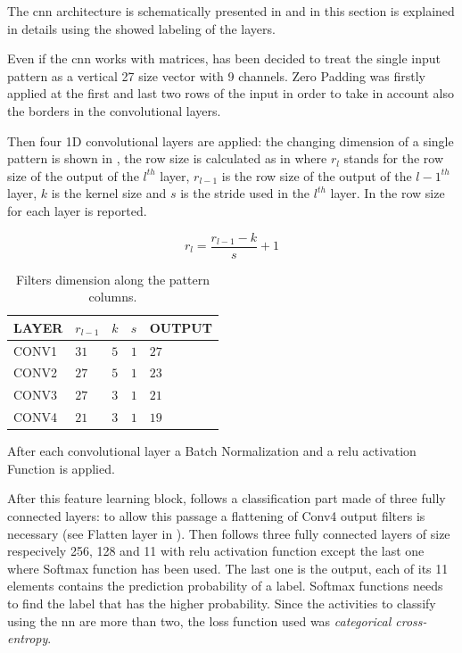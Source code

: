 The \gls{cnn} architecture is schematically presented in  and in this section is explained in details using the showed labeling of the layers.

Even if the \gls{cnn} works with matrices, has been decided to treat the single input pattern as a vertical 27 size vector with 9 channels. Zero Padding was firstly applied at the first and last two rows of the input in order to take in account also the borders in the convolutional layers.

Then four 1D convolutional layers are applied: the changing dimension of a single pattern is shown in , the row size is calculated as in  where $r_l$ stands for the row size of the output of the $l^{th}$ layer, $r_{l-1}$ is the row size of the output of the $l-1^{th}$ layer, $k$ is the kernel size and $s$ is the stride used in the $l^{th}$ layer. In  the row size for each layer is reported.

\begin{equation}
  \label{eq:row_size}
  r_l = \frac{r_{l-1} - k}{s} + 1
\end{equation}


\begin{table}[htp]
\small
	\centering
		\renewcommand{\arraystretch}{1}%
	\begin{tabular}{@{}lllll@{}}
	\toprule
	LAYER & $r_{l-1}$ & $k$ & $s$ & OUTPUT\\
	\midrule
	CONV1 & $31$ & $5$ & $1$ & $27$\\
	CONV2 & $27$ & $5$ & $1$ & $23$\\
	CONV3 & $27$ & $3$ & $1$ & $21$\\
	CONV4 & $21$ & $3$ & $1$ & $19$\\
	\bottomrule
	\end{tabular}
	\caption{Filters dimension along the pattern columns.}
	\label{tab:filtersize}
\end{table}

After each convolutional layer a Batch Normalization and a \gls{relu} activation Function is applied.

After this feature learning block, follows a classification part made of three fully connected layers: to allow this passage a flattening of Conv4 output filters is necessary (see Flatten layer in ). Then follows three fully connected layers of size respecively 256, 128 and 11 with \gls{relu} activation function except the last one where Softmax function has been used. The last one is the output, each of its 11 elements contains the prediction probability of a label. Softmax functions needs to find the label that has the higher probability. Since the activities to classify using the \gls{nn} are  more than two, the loss function used was \textit{categorical cross-entropy}.

